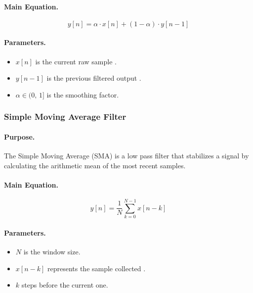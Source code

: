 \paragraph{Main Equation.}
\begin{equation}
    y[n] = \alpha \cdot x[n] + (1 - \alpha) \cdot y[n-1]
    \label{eq:ema}
\end{equation}

\paragraph{Parameters.}
\begin{itemize}
\item $x[n]$ is the current raw sample .
\item $y[n-1]$ is the previous filtered output .
\item $\alpha \in (0,\,1]$ is the smoothing factor.
\end{itemize}


\subsubsection{Simple Moving Average Filter}

\paragraph{Purpose.}
The Simple Moving Average (SMA) is a low pass filter that stabilizes a signal by 
calculating the arithmetic mean  of the most recent samples. 


\paragraph{Main Equation.}
\begin{equation}
    y[n] = \frac{1}{N} \sum_{k=0}^{N-1} x[n-k]
    \label{eq:sma}
\end{equation}

\paragraph{Parameters.}
\begin{itemize}
\item $N$ is the window size. 
\item $x[n-k]$ represents the sample collected . 
\item $k$ steps before the current one.
\end{itemize}

